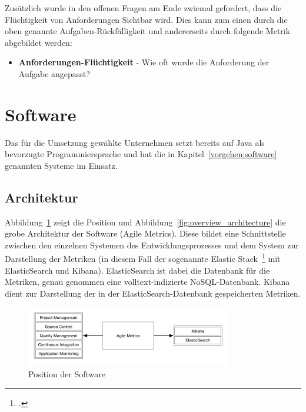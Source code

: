 Zusätzlich wurde in den offenen Fragen am Ende zwiemal gefordert, dass die Flüchtigkeit von Anforderungen Sichtbar wird. 
Dies kann zum einen durch die oben genannte Aufgaben-Rückfälligkeit und andererseits durch folgende Metrik abgebildet werden:

\begin{itemize}[noitemsep]
    \item \textbf{Anforderungen-Flüchtigkeit} \mbox{-} Wie oft wurde die Anforderung der Aufgabe angepasst?
\end{itemize}

\section{Software}

Das für die Umsetzung gewählte Unternehmen setzt bereits auf Java als bevorzugte Programmiersprache und hat die in Kapitel~\ref{vorgehen:software} genannten Systeme im Einsatz.

\subsection{Architektur}

Abbildung~\ref{fig:position_architecture} zeigt die Position und Abbildung~\ref{fig:overview_architecture} die grobe Architektur der Software (Agile Metrics).
Diese bildet eine Schnittstelle zwischen den einzelnen Systemen des Entwicklungsprozesses und dem System zur Darstellung der Metriken (in diesem Fall der sogenannte Elastic Stack~\footcite{elastic_stack} mit ElasticSearch und Kibana).
ElasticSearch ist dabei die Datenbank für die Metriken, genau genommen eine volltext-indizierte \ac{NoSQL}-Datenbank.
Kibana dient zur Darstellung der in der ElasticSearch-Datenbank gespeicherten Metriken.

\begin{savenotes}
    \begin{figure}[H] 
        \centering
            \includegraphics[width=0.8\textwidth]{img/position-overview.png}
        \caption{Position der Software}\label{fig:position_architecture}
    \end{figure}
\end{savenotes}

